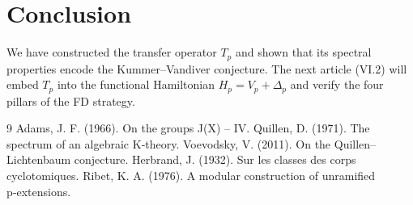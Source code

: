 \documentclass[11pt,a4paper]{article}
\begin{document}
\section{Conclusion}
We have constructed the transfer operator $T_p$ and shown that its spectral properties encode the Kummer–Vandiver conjecture. The next article (VI.2) will embed $T_p$ into the functional Hamiltonian $H_p = V_p + \Delta_p$ and verify the four pillars of the FD strategy.


\begin{thebibliography}{9}
  Adams, J. F. (1966). On the groups J(X) – IV.
  Quillen, D. (1971). The spectrum of an algebraic K‑theory.
  Voevodsky, V. (2011). On the Quillen–Lichtenbaum conjecture.
  Herbrand, J. (1932). Sur les classes des corps cyclotomiques.
  Ribet, K. A. (1976). A modular construction of unramified p‑extensions.
\end{thebibliography}
\end{document}
